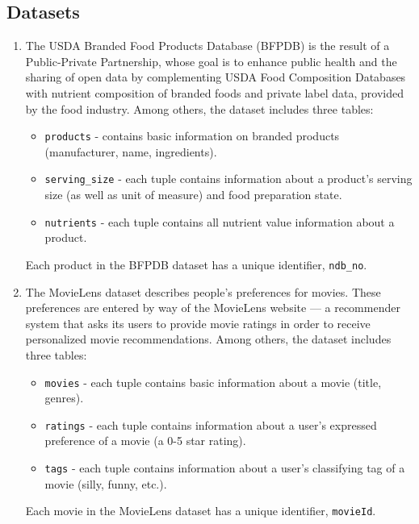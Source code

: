 \subsection{Datasets}\label{sec:datasets}
\begin{enumerate}
    \item The USDA Branded Food Products Database (BFPDB) \cite{usda_bfpd-dataset} is the result of a Public-Private Partnership, whose goal is to enhance public health and the sharing of open data by complementing USDA Food Composition Databases with nutrient composition of branded foods and private label data, provided by the food industry. Among others, the dataset includes three tables:
    \begin{itemize}
        \item \texttt{products} - contains basic information on branded products (manufacturer, name, ingredients).
        \item \texttt{serving\_size} - each tuple contains information about a product's serving size (as well as unit of measure) and food preparation state.
        \item \texttt{nutrients} - each tuple contains all nutrient value information about a product.
    \end{itemize}
    Each product in the BFPDB dataset has a unique identifier, \texttt{ndb\_no}.
    
    \item The MovieLens dataset \cite{movielens-dataset} describes people’s preferences for movies. These preferences are entered by way of the MovieLens website \cite{movielens-recommender-website} — a recommender system that asks its users to provide movie ratings in order to receive personalized movie recommendations. Among others, the dataset includes three tables:
    \begin{itemize}
        \item \texttt{movies} - each tuple contains basic information about a movie (title, genres).
        \item \texttt{ratings} - each tuple contains information about a user's expressed preference of a movie (a 0-5 star rating).
        \item \texttt{tags} - each tuple contains information about a user's classifying tag of a movie (silly, funny, etc.).
    \end{itemize}
    Each movie in the MovieLens dataset has a unique identifier, \texttt{movieId}.
\end{enumerate}

